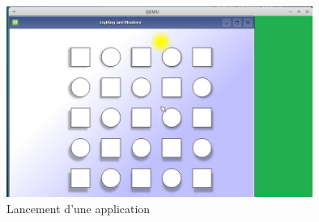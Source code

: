 \begin{figure}[H]
	\begin{center}
		\includegraphics[width=10cm]{img/linux2.png}
		\caption{Lancement d'une application}
		\label{linux2}
	\end{center}
\end{figure}
